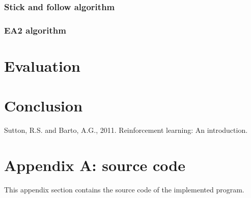 \documentclass[runningheads]{llncs}
\begin{document}
\subsubsection{Stick and follow algorithm}
\subsubsection{EA2 algorithm}


\section{Evaluation}

\section{Conclusion}

\begin{thebibliography}{8}

Sutton, R.S. and Barto, A.G., 2011. Reinforcement learning: An introduction.

\end{thebibliography}

\section{Appendix A: source code}\label{appendix}
This appendix section contains the source code of the implemented program.

\end{document}
